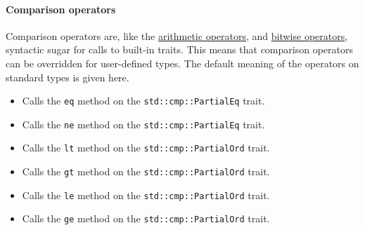 \documentclass[]{article}
\begin{document}
\paragraph{Comparison operators}\label{comparison-operators}

Comparison operators are, like the
\hyperref[arithmetic-operators]{arithmetic operators}, and
\hyperref[bitwise-operators]{bitwise operators}, syntactic sugar for
calls to built-in traits. This means that comparison operators can be
overridden for user-defined types. The default meaning of the operators
on standard types is given here.

\begin{itemize}
\item

  Calls the \texttt{eq} method on the \texttt{std::cmp::PartialEq}
  trait.
\item

  Calls the \texttt{ne} method on the \texttt{std::cmp::PartialEq}
  trait.
\item

  Calls the \texttt{lt} method on the \texttt{std::cmp::PartialOrd}
  trait.
\item

  Calls the \texttt{gt} method on the \texttt{std::cmp::PartialOrd}
  trait.
\item

  Calls the \texttt{le} method on the \texttt{std::cmp::PartialOrd}
  trait.
\item

  Calls the \texttt{ge} method on the \texttt{std::cmp::PartialOrd}
  trait.
\end{itemize}
\end{document}
